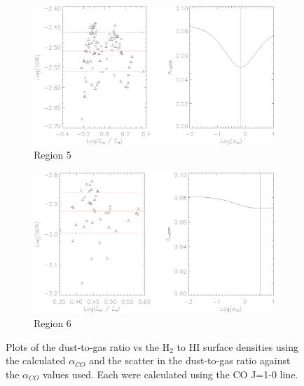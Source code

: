 \begin{figure}
  \ContinuedFloat
  \begin{subfigure}[t]{1\textwidth}
    \centering
    \includegraphics[width=1.\textwidth]{dgr_imgs/region_5_aco_output_10.eps}
    \caption{Region 5}
  \end{subfigure}

  \begin{subfigure}[t]{1\textwidth}
    \centering
    \includegraphics[width=1.\textwidth]{dgr_imgs/region_6_aco_output_10.eps}
    \caption{Region 6}
  \end{subfigure}
   \caption[Dust-to-Gas Ratio Determination Plots for CO J=1-0]{Plots of the dust-to-gas ratio vs the H$_2$ to HI surface densities using the calculated $\alpha_{CO}$ and the scatter in the dust-to-gas ratio against the $\alpha_{CO}$ values used.  Each were calculated using the CO J=1-0 line.}
   \label{fig:dgr_co10}
\end{figure}

